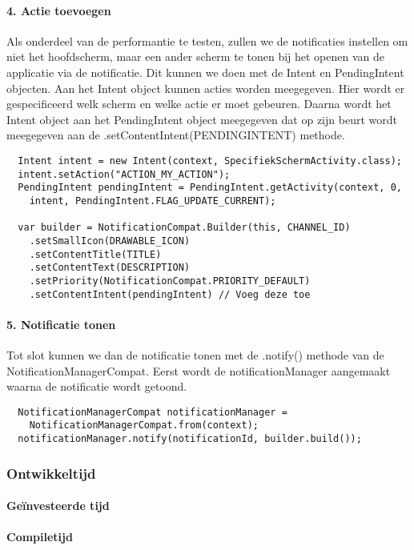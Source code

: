 \paragraph{4. Actie toevoegen}
Als onderdeel van de performantie te testen, zullen we de notificaties instellen om niet het hoofdscherm, 
maar een ander scherm te tonen bij het openen van de applicatie via de notificatie. Dit kunnen we doen met 
de Intent en PendingIntent objecten. Aan het Intent object kunnen acties worden meegegeven. Hier wordt er 
gespecificeerd welk scherm en welke actie er moet gebeuren. Daarna wordt het Intent object aan het PendingIntent 
object meegegeven dat op zijn beurt wordt meegegeven aan de .setContentIntent(PENDINGINTENT) methode.
\begin{verbatim}
  Intent intent = new Intent(context, SpecifiekSchermActivity.class);
  intent.setAction("ACTION_MY_ACTION");
  PendingIntent pendingIntent = PendingIntent.getActivity(context, 0, 
    intent, PendingIntent.FLAG_UPDATE_CURRENT);

  var builder = NotificationCompat.Builder(this, CHANNEL_ID)
    .setSmallIcon(DRAWABLE_ICON)
    .setContentTitle(TITLE)
    .setContentText(DESCRIPTION)
    .setPriority(NotificationCompat.PRIORITY_DEFAULT)
    .setContentIntent(pendingIntent) // Voeg deze toe
\end{verbatim}

\paragraph{5. Notificatie tonen}
Tot slot kunnen we dan de notificatie tonen met de .notify() methode van de NotificationManagerCompat. 
Eerst wordt de notificationManager aangemaakt waarna de notificatie wordt getoond.
\begin{verbatim}
  NotificationManagerCompat notificationManager = 
    NotificationManagerCompat.from(context);
  notificationManager.notify(notificationId, builder.build());
\end{verbatim}

\subsubsection{Ontwikkeltijd}

\paragraph{Geïnvesteerde tijd}

\paragraph{Compiletijd}

